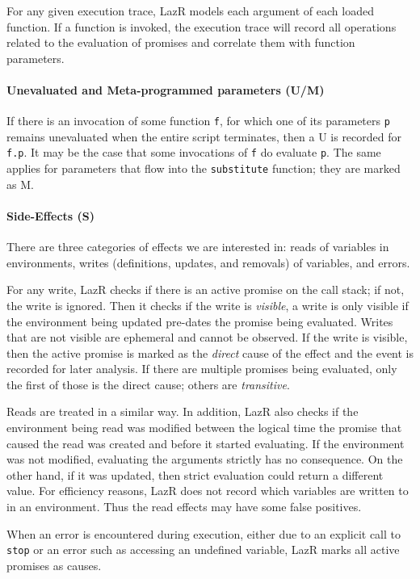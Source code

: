 \documentclass[review,nonacm,screen,acmsmall,anonymous=true]{acmart}
\renewcommand{\c}[1]{\lstinline |#1|\xspace}
\newcommand{\lazr}{{\sf LazR}\xspace}
\begin{document}
For any given execution trace, \lazr models each argument of each loaded
function. If a function is invoked, the execution trace will record all
operations related to the evaluation of promises and correlate them with
function parameters.

\paragraph{Unevaluated and Meta-programmed parameters (U/M)}
If there is an invocation of some function \c f, for which one of its parameters
\c p remains unevaluated when the entire script terminates, then a U is recorded
for \c{f.p}. It may be the case that some invocations of \c f do evaluate \c p.
The same applies for parameters that flow into the \c{substitute} function; they
are marked as M.

\paragraph{Side-Effects (S)}
There are three categories of effects we are interested in: reads of variables
in environments, writes (definitions, updates, and removals) of variables, and
errors.

For any write, \lazr checks if there is an active promise on the call stack; if
not, the write is ignored. Then it checks if the write is \emph{visible}, a
write is only visible if the environment being updated pre-dates the promise
being evaluated. Writes that are not visible are ephemeral and cannot be
observed. If the write is visible, then the active promise is marked as the
\emph{direct} cause of the effect and the event is recorded for later analysis.
If there are multiple promises being evaluated, only the first of those is the
direct cause; others are \emph{transitive}.

Reads are treated in a similar way. In addition, \lazr also checks if the
environment being read was modified between the logical time the promise that
caused the read was created and before it started evaluating. If the environment
was not modified, evaluating the arguments strictly has no consequence. On the
other hand, if it was updated, then strict evaluation could return a different
value.
For efficiency reasons, \lazr does not record which variables are written
to in an environment. Thus the read effects may have some false positives.

When an error is encountered during execution, either due to an explicit call to
\c{stop} or an error such as accessing an undefined variable, \lazr marks all
active promises as causes.
\end{document}

